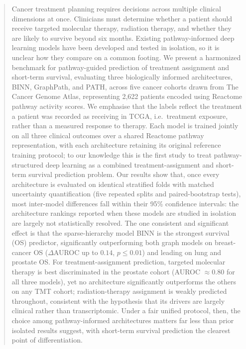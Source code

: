 \documentclass[sigconf]{acmart}
\begin{document}
\begin{abstract}
Cancer treatment planning requires decisions across multiple clinical
dimensions at once. Clinicians must determine whether a patient should
receive targeted molecular therapy, radiation therapy, and whether they
are likely to survive beyond six months. Existing pathway-informed deep
learning models have been developed and tested in isolation, so it is
unclear how they compare on a common footing. We present a harmonized
benchmark for pathway-guided prediction of treatment assignment and
short-term survival, evaluating three biologically informed
architectures, BINN, GraphPath, and PATH, across five cancer cohorts
drawn from The Cancer Genome Atlas, representing 2,622 patients encoded
using Reactome pathway activity scores. We emphasise that the labels
reflect the treatment a patient was recorded as receiving in TCGA, i.e.\
treatment exposure, rather than a measured response to therapy. Each
model is trained jointly on all three clinical outcomes over a shared
Reactome pathway representation, with each architecture retaining its
original reference training protocol; to our knowledge this is the first
study to treat pathway-structured deep learning as a combined
treatment-assignment and short-term survival prediction problem. Our
results show that, once every architecture is evaluated on identical
stratified folds with matched uncertainty quantification (five repeated
splits and paired-bootstrap tests), most inter-model differences fall
within their 95\% confidence intervals: the architecture rankings reported
when these models are studied in isolation are largely not statistically
resolved. The one consistent and significant effect is that the
sparse-hierarchy model BINN is the strongest survival (OS) predictor,
significantly outperforming both graph models on breast-cancer OS
($\Delta$AUROC up to $0.14$, $p\!\leq\!0.01$) and leading on lung and
prostate OS. For treatment-assignment prediction, targeted molecular
therapy is best discriminated in the prostate cohort (AUROC $\approx0.80$
for all three models), yet no architecture significantly outperforms the
others on any TMT cohort; radiation-therapy assignment is weakly predicted
throughout, consistent with the hypothesis that its drivers are largely
clinical rather than transcriptomic. Under a fair unified protocol, then,
the choice among pathway-informed architectures matters far less than
prior isolated results suggest, with short-term survival prediction the
clearest point of differentiation.
\end{abstract}
\end{document}
